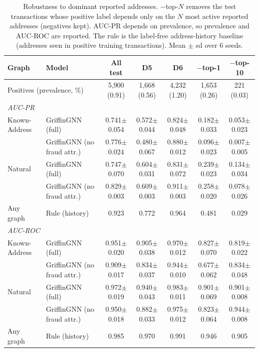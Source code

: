 \begin{table}[t]\centering\small
\caption{Robustness to dominant reported addresses. $-$top-$N$ removes the test transactions whose positive label depends only on the $N$ most active reported addresses (negatives kept). AUC-PR depends on prevalence, so prevalence and AUC-ROC are reported. The rule is the label-free address-history baseline (addresses seen in positive training transactions). Mean $\pm$ sd over 6 seeds.}
\label{tab:dominant}
\begin{tabular}{llccccc}\toprule
Graph & Model & All test & D5 & D6 & $-$top-1 & $-$top-10 \\
\midrule
\multicolumn{2}{l}{Positives (prevalence, \%)} & 5,900 (0.91) & 1,668 (0.56) & 4,232 (1.20) & 1,653 (0.26) & 221 (0.03) \\
\midrule
\multicolumn{7}{l}{\textit{AUC-PR}} \\
Known-Address & GriffinGNN (full) & 0.741$\pm$0.054 & 0.572$\pm$0.044 & 0.824$\pm$0.048 & 0.182$\pm$0.033 & 0.053$\pm$0.023 \\
 & GriffinGNN (no fraud attr.) & 0.776$\pm$0.024 & 0.480$\pm$0.067 & 0.880$\pm$0.012 & 0.096$\pm$0.023 & 0.007$\pm$0.005 \\
Natural & GriffinGNN (full) & 0.747$\pm$0.070 & 0.604$\pm$0.031 & 0.831$\pm$0.072 & 0.239$\pm$0.023 & 0.134$\pm$0.034 \\
 & GriffinGNN (no fraud attr.) & 0.829$\pm$0.003 & 0.609$\pm$0.003 & 0.911$\pm$0.003 & 0.258$\pm$0.020 & 0.078$\pm$0.026 \\
Any graph & Rule (history) & 0.923 & 0.772 & 0.964 & 0.481 & 0.029 \\
\midrule
\multicolumn{7}{l}{\textit{AUC-ROC}} \\
Known-Address & GriffinGNN (full) & 0.951$\pm$0.020 & 0.905$\pm$0.038 & 0.970$\pm$0.012 & 0.827$\pm$0.070 & 0.819$\pm$0.022 \\
 & GriffinGNN (no fraud attr.) & 0.909$\pm$0.017 & 0.834$\pm$0.037 & 0.944$\pm$0.010 & 0.677$\pm$0.062 & 0.834$\pm$0.048 \\
Natural & GriffinGNN (full) & 0.972$\pm$0.019 & 0.940$\pm$0.043 & 0.983$\pm$0.011 & 0.901$\pm$0.069 & 0.901$\pm$0.008 \\
 & GriffinGNN (no fraud attr.) & 0.950$\pm$0.018 & 0.882$\pm$0.033 & 0.975$\pm$0.012 & 0.823$\pm$0.064 & 0.944$\pm$0.008 \\
Any graph & Rule (history) & 0.985 & 0.970 & 0.991 & 0.946 & 0.905 \\
\bottomrule\end{tabular}\end{table}
